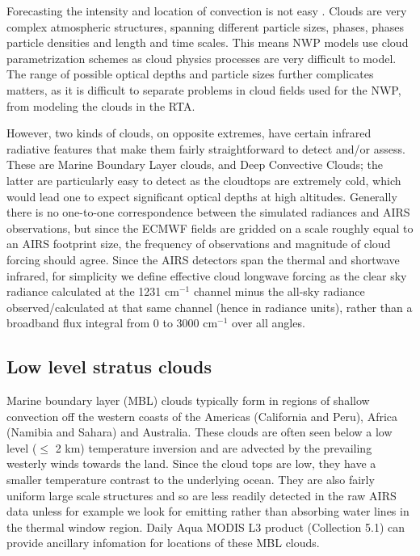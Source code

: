 \documentclass[agupp]{aguplus}              %
\newcommand{\wn}{cm$^{-1}$\xspace}
\begin{document}
\begin{article}
Forecasting the intensity and location of convection is not easy
\cite{ste:07}.  Clouds are very complex atmospheric structures,
spanning different particle sizes, phases, phases particle densities
and length and time scales. This means NWP models use cloud
parametrization schemes as cloud physics processes are very difficult
to model. The range of possible optical depths and particle sizes
further complicates matters, as it is difficult to separate problems
in cloud fields used for the NWP, from modeling the clouds in the RTA.

However, two kinds of clouds, on opposite extremes, have certain
infrared radiative features that make them fairly straightforward to
detect and/or assess. These are Marine Boundary Layer clouds, and Deep
Convective Clouds; the latter are particularly easy to detect as the
cloudtops are extremely cold, which would lead one to expect
significant optical depths at high altitudes. Generally there is no
one-to-one correspondence between the simulated radiances and AIRS
observations, but since the ECMWF fields are gridded on a scale
roughly equal to an AIRS footprint size, the frequency of
observations and magnitude of cloud forcing should agree. Since the AIRS
detectors span the thermal and shortwave infrared, for simplicity we
define effective cloud longwave forcing as the clear sky radiance
calculated at the 1231 \wn channel minus the all-sky radiance
observed/calculated at that same channel (hence in radiance units),
rather than a broadband flux integral from 0 to 3000 \wn over all
angles.

\subsection{Low level stratus clouds}

Marine boundary layer (MBL) clouds typically form in regions of
shallow convection off the western coasts of the Americas (California
and Peru), Africa (Namibia and Sahara) and Australia. These clouds are
often seen below a low level ($\le$ 2 km) temperature inversion and
are advected by the prevailing westerly winds towards the land. Since
the cloud tops are low, they have a smaller temperature contrast to
the underlying ocean.  They are also fairly uniform large scale
structures and so are less readily detected in the raw AIRS data
unless for example we look for emitting rather than absorbing water
lines in the thermal window region. Daily Aqua MODIS L3 product
(Collection 5.1) can provide ancillary infomation for locations of these
MBL clouds.


\end{article}
\end{document}
